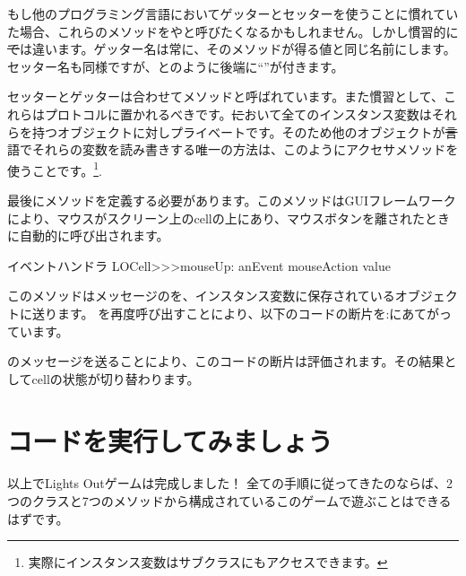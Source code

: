 \documentclass[a4paper,10pt,twoside]{book}
\begin{document}
もし他のプログラミング言語においてゲッターとセッターを使うことに慣れていた場合、これらのメソッドをやと呼びたくなるかもしれません。しかし慣習的に\st では違います。ゲッター名は常に、そのメソッドが得る値と同じ名前にします。セッター名も同様ですが、とのように後端に``\ct{:}''が付きます。

セッターとゲッターは合わせてメソッドと呼ばれています。また慣習として、これらはプロトコルに置かれるべきです。\st において全てのインスタンス変数はそれらを持つオブジェクトに対しプライベートです。そのため他のオブジェクトが\st 言語でそれらの変数を読み書きする唯一の方法は、このようにアクセサメソッドを使うことです。\footnote{実際にインスタンス変数はサブクラスにもアクセスできます。
}.


最後にメソッドを定義する必要があります。このメソッドはGUIフレームワークにより、マウスがスクリーン上のcellの上にあり、マウスボタンを離されたときに自動的に呼び出されます。

\begin{method}[sbecellmouseup]{イベントハンドラ}
LOCell>>>mouseUp: anEvent
   mouseAction value
\end{method}


このメソッドはメッセージのを、インスタンス変数に保存されているオブジェクトに送ります。 を再度呼び出すことにより、以下のコードの断片を:にあてがっています。


\noindent
{}のメッセージを送ることにより、このコードの断片は評価されます。その結果としてcellの状態が切り替わります。

\section{コードを実行してみましょう}

以上でLights Outゲームは完成しました！
全ての手順に従ってきたのならば、2つのクラスと7つのメソッドから構成されているこのゲームで遊ぶことはできるはずです。
\end{document}
